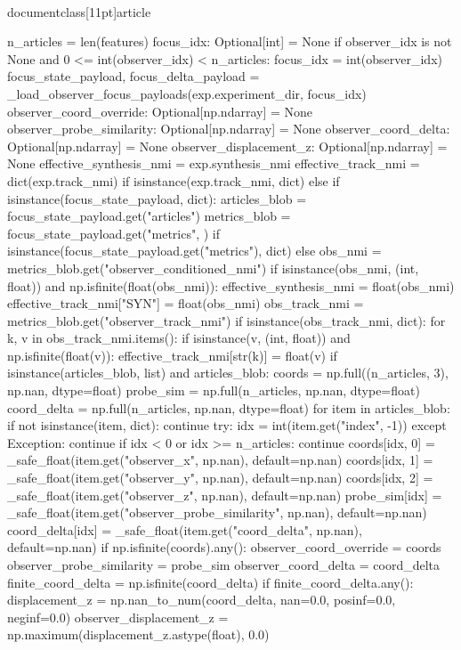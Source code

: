 \\documentclass[11pt]{article}
\begin{document}
\begin{CodeBlock}
{{{{{    n_articles = len(features)
    focus_idx: Optional[int] = None
    if observer_idx is not None and 0 <= int(observer_idx) < n_articles:
        focus_idx = int(observer_idx)
    focus_state_payload, focus_delta_payload = _load_observer_focus_payloads(exp.experiment_dir, focus_idx)
    observer_coord_override: Optional[np.ndarray] = None
    observer_probe_similarity: Optional[np.ndarray] = None
    observer_coord_delta: Optional[np.ndarray] = None
    observer_displacement_z: Optional[np.ndarray] = None
    effective_synthesis_nmi = exp.synthesis_nmi
    effective_track_nmi = dict(exp.track_nmi) if isinstance(exp.track_nmi, dict) else {}
    if isinstance(focus_state_payload, dict):
        articles_blob = focus_state_payload.get("articles")
        metrics_blob = focus_state_payload.get("metrics", {}) if isinstance(focus_state_payload.get("metrics"), dict) else {}
        obs_nmi = metrics_blob.get("observer_conditioned_nmi")
        if isinstance(obs_nmi, (int, float)) and np.isfinite(float(obs_nmi)):
            effective_synthesis_nmi = float(obs_nmi)
            effective_track_nmi["SYN"] = float(obs_nmi)
        obs_track_nmi = metrics_blob.get("observer_track_nmi")
        if isinstance(obs_track_nmi, dict):
            for k, v in obs_track_nmi.items():
                if isinstance(v, (int, float)) and np.isfinite(float(v)):
                    effective_track_nmi[str(k)] = float(v)
        if isinstance(articles_blob, list) and articles_blob:
            coords = np.full((n_articles, 3), np.nan, dtype=float)
            probe_sim = np.full(n_articles, np.nan, dtype=float)
            coord_delta = np.full(n_articles, np.nan, dtype=float)
            for item in articles_blob:
                if not isinstance(item, dict):
                    continue
                try:
                    idx = int(item.get("index", -1))
                except Exception:
                    continue
                if idx < 0 or idx >= n_articles:
                    continue
                coords[idx, 0] = _safe_float(item.get("observer_x", np.nan), default=np.nan)
                coords[idx, 1] = _safe_float(item.get("observer_y", np.nan), default=np.nan)
                coords[idx, 2] = _safe_float(item.get("observer_z", np.nan), default=np.nan)
                probe_sim[idx] = _safe_float(item.get("observer_probe_similarity", np.nan), default=np.nan)
                coord_delta[idx] = _safe_float(item.get("coord_delta", np.nan), default=np.nan)
            if np.isfinite(coords).any():
                observer_coord_override = coords
                observer_probe_similarity = probe_sim
                observer_coord_delta = coord_delta
                finite_coord_delta = np.isfinite(coord_delta)
                if finite_coord_delta.any():
                    displacement_z = np.nan_to_num(coord_delta, nan=0.0, posinf=0.0, neginf=0.0)
                    observer_displacement_z = np.maximum(displacement_z.astype(float), 0.0)

}}}}}
\end{CodeBlock}
\end{document}
